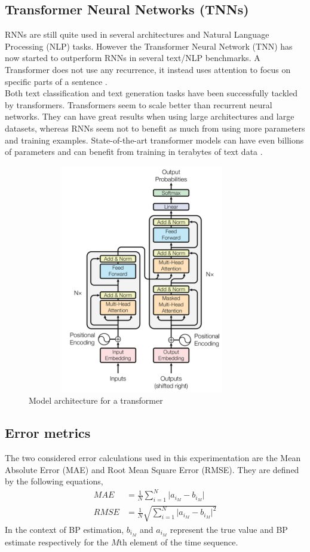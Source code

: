 \documentclass[11pt, a4paper]{article}
\begin{document}
\subsection{Transformer Neural Networks (TNNs)}
RNNs are still quite used in several architectures and Natural Language Processing (NLP) tasks. However the Transformer Neural Network (TNN) has now started to outperform RNNs in several text/NLP benchmarks. A Transformer does not use any recurrence, it instead uses attention to focus on specific parts of a sentence \cite{deeplearning}. \\ \newline \noindent Both text classification and text generation tasks have been successfully tackled by transformers. Transformers seem to scale better than recurrent neural networks. They can have great results when using large architectures and large datasets, whereas RNNs seem not to benefit as much from using more parameters and training examples. State-of-the-art transformer models can have even billions of parameters and can benefit from training in terabytes of text data \cite{deeplearning}. \begin{figure}[H]
    \centering
    \includegraphics[width=10cm,height=10cm,keepaspectratio]{Figures/tnn.png}
    \caption{Model architecture for a transformer}
    \label{rnn2}
\end{figure} 

\subsection{Error metrics}
The two considered error calculations used in this experimentation are the Mean Absolute Error (MAE) and Root Mean Square Error (RMSE). They are defined by the following equations, \begin{align}
    MAE &= \frac{1}{N} \sum_{i=1}^N \lvert a_{i_{M}} - b_{i_{M}} \rvert \\
    RMSE &= \frac{1}{N} \sqrt{\sum_{i=1}^N \lvert a_{i_{M}} - b_{i_{M}} \rvert^2}
\end{align}\noindent In the context of BP estimation, $b_{i_{M}}$ and $a_{i_{M}}$ represent the true value and BP estimate respectively for the $M$th element of the time sequence.
\end{document}
